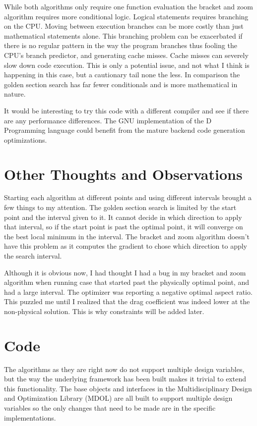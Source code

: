 \documentclass[12pt,parskip=full]{article}
\numberwithin{subsection}{section}
\begin{document}
		While both algorithms only require one function evaluation the bracket and zoom 
		algorithm requires more conditional logic. Logical statements requires branching on the CPU. Moving between execution branches can be more costly 
		than just mathematical statements alone. This branching problem can be exacerbated if there is no regular pattern in the way the program branches
		thus fooling the CPU's branch predictor, and generating cache misses. Cache misses can severely slow down code execution. This is only a potential
		issue, and not what I think is happening in this case, but a cautionary tail none the less. In comparison the golden section search has far 
		fewer conditionals and is more mathematical in nature.
		
		It would be interesting to try this code with a different compiler and see if there are any performance differences. The GNU implementation
		of the D Programming language could benefit from the mature backend code generation optimizations.
		
	\section{Other Thoughts and Observations}
	
		Starting each algorithm at different points and using different intervals brought a few things to my attention. The golden section search is
		limited by the start point and the interval given to it. It cannot decide in which direction to apply that interval, so if the start point is
		past the optimal point, it will converge on the best local minimum in the interval. The bracket and zoom algorithm doesn't have this problem
		as it computes the gradient to chose which direction to apply the search interval.
		
		Although it is obvious now, I had thought I had a bug in my bracket and zoom algorithm when running case that started past the physically optimal
		point, and had a large interval. The optimizer was reporting a negative optimal aspect ratio. This puzzled me until I realized that the drag 
		coefficient was indeed lower at the non-physical solution. This is why constraints will be added later.
		
	\section{Code}
	
		The algorithms as they are right now do not support multiple design variables, but the way the underlying framework has been built makes it trivial
		to extend this functionality. The base objects and interfaces in the Multidisciplinary Design and Optimization Library (MDOL) are all built to 
		support multiple design variables so the only changes that need to be made are in the specific implementations.
		
\end{document}
